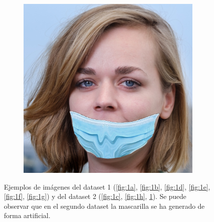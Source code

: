 \begin{figure}[htp]
	\begin{subfigure}{0.2\linewidth}
		\includegraphics[width=\linewidth]{imagenes/dataset1-9.jpg}
		\caption{}
		\label{fig:1i}
	\end{subfigure}
	\caption[Ejemplos de imágenes del dataset 1 y del dataset 2]{Ejemplos de imágenes del dataset 1 (\ref{fig:1a}, \ref{fig:1b}, \ref{fig:1d}, \ref{fig:1e}, \ref{fig:1f}, \ref{fig:1g}) y del dataset 2 (\ref{fig:1c}, \ref{fig:1h}, \ref{fig:1i}). Se puede observar que en el segundo dataset la mascarilla se ha generado de forma artificial.}
	\label{fig:1}
\end{figure}


